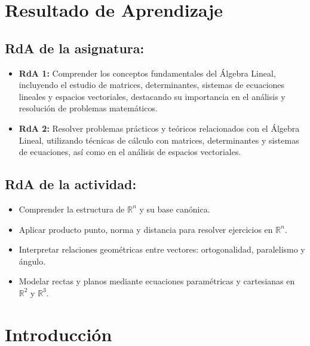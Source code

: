 \documentclass[a4,11pt]{aleph-notas}
\begin{document}
\encabezado 

\section*{Resultado de Aprendizaje}

\subsection*{RdA de la asignatura:}
\begin{itemize}[leftmargin=*]
    \item \textbf{RdA 1:} Comprender los conceptos fundamentales del Álgebra Lineal, incluyendo el estudio de matrices, determinantes, sistemas de ecuaciones lineales y espacios vectoriales, destacando su importancia en el análisis y resolución de problemas matemáticos.
    \item \textbf{RdA 2:} Resolver problemas prácticos y teóricos relacionados con el Álgebra Lineal, utilizando técnicas de cálculo con matrices, determinantes y sistemas de ecuaciones, así como en el análisis de espacios vectoriales.
\end{itemize}


\subsection*{RdA de la actividad:}
\begin{itemize}[leftmargin=*]
    \item Comprender la estructura de $\mathbb{R}^n$ y su base canónica.
    \item Aplicar producto punto, norma y distancia para resolver ejercicios en $\mathbb{R}^n$.
    \item Interpretar relaciones geométricas entre vectores: ortogonalidad, paralelismo y ángulo.
    \item Modelar rectas y planos mediante ecuaciones paramétricas y cartesianas en $\mathbb{R}^2$ y $\mathbb{R}^3$.
\end{itemize}

\section*{Introducción}
\end{document}
